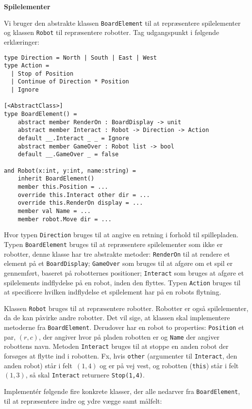 \textbf{Spilelementer}

Vi bruger den abstrakte klassen \lstinline{BoardElement} til at
repræsentere spilelementer og klassen \lstinline{Robot} til
repræsentere robotter. Tag udgangspunkt i følgende
erklæringer:

\begin{lstlisting}
type Direction = North | South | East | West
type Action =
  | Stop of Position
  | Continue of Direction * Position
  | Ignore

[<AbstractClass>]
type BoardElement() =
    abstract member RenderOn : BoardDisplay -> unit
    abstract member Interact : Robot -> Direction -> Action
    default __.Interact _ _ = Ignore
    abstract member GameOver : Robot list -> bool
    default __.GameOver _ = false

and Robot(x:int, y:int, name:string) =
    inherit BoardElement()
    member this.Position = ...
    override this.Interact other dir = ...
    override this.RenderOn display = ...
    member val Name = ...
    member robot.Move dir = ...
\end{lstlisting}

Hvor typen \lstinline{Direction} bruges til at angive en retning i
forhold til spillepladen. Typen \lstinline{BoardElement} bruges til at
repræsentere spilelementer som ikke er robotter, denne klasse har tre
abstrakte metoder: \lstinline{RenderOn} til at rendere et element på
et \lstinline{BoardDisplay}; \lstinline{GameOver} som bruges til at
afgøre om et spil er gennemført, baseret på robotternes positioner;
\lstinline{Interact} som bruges at afgøre et spilelements indflydelse
på en robot, inden den flyttes. Typen \lstinline{Action} bruges til at
specificere hvilken indflydelse et spilelement har på en robots
flytning.

Klassen \lstinline{Robot} bruges til at repræsentere
robotter. Robotter er også spilelementer, da de kan påvirke andre
robotter. Det vil sige, at klassen skal implementere metoderne fra
\lstinline{BoardElement}. Derudover har en robot to properties:
\lstinline{Position} et par, $(r,c)$, der angiver hvor
på pladen robotten er og \lstinline{Name} der angiver robottens
navn. Metoden \lstinline{Interact} bruges til at stoppe en anden robot
der forsøges at flytte ind i robotten. Fx, hvis \lstinline{other}
(argumenter til \lstinline{Interact}, den anden robot) står i
felt~$(1,4)$ og er på vej vest, og robotten (\lstinline{this}) står i
felt~$(1,3)$, så skal \lstinline{Interact} returnere \lstinline{Stop(1,4)}.


Implementér følgende fire konkrete klasser, der alle nedarver fra
\lstinline{BoardElement}, til at repræsentere indre og ydre vægge samt målfelt:

